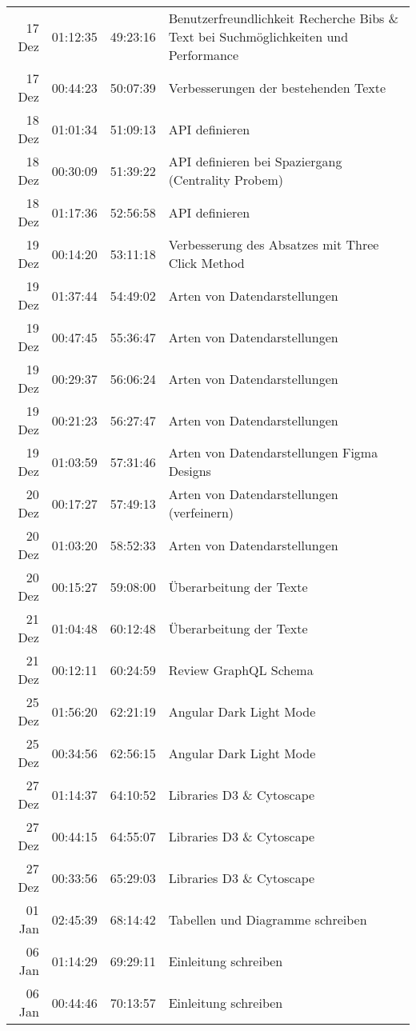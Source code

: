\begin{longtable}{r | r | r | p{}}
	 17 Dez & 01:12:35 & 49:23:16 & Benutzerfreundlichkeit Recherche Bibs \& Text bei Suchmöglichkeiten und Performance \\ 
	 17 Dez & 00:44:23 & 50:07:39 & Verbesserungen der bestehenden Texte \\ 
	 18 Dez & 01:01:34 & 51:09:13 & API definieren \\ 
	 18 Dez & 00:30:09 & 51:39:22 & API definieren bei Spaziergang (Centrality Probem) \\ 
	 18 Dez & 01:17:36 & 52:56:58 & API definieren \\ 
	 19 Dez & 00:14:20 & 53:11:18 & Verbesserung des Absatzes mit Three Click Method \\ 
	 19 Dez & 01:37:44 & 54:49:02 & Arten von Datendarstellungen \\ 
	 19 Dez & 00:47:45 & 55:36:47 & Arten von Datendarstellungen \\ 
	 19 Dez & 00:29:37 & 56:06:24 & Arten von Datendarstellungen \\ 
	 19 Dez & 00:21:23 & 56:27:47 & Arten von Datendarstellungen \\ 
	 19 Dez & 01:03:59 & 57:31:46 & Arten von Datendarstellungen Figma Designs \\ 
	 20 Dez & 00:17:27 & 57:49:13 & Arten von Datendarstellungen (verfeinern) \\ 
	 20 Dez & 01:03:20 & 58:52:33 & Arten von Datendarstellungen \\ 
	 20 Dez & 00:15:27 & 59:08:00 & Überarbeitung der Texte \\ 
	 21 Dez & 01:04:48 & 60:12:48 & Überarbeitung der Texte \\ 
	 21 Dez & 00:12:11 & 60:24:59 & Review GraphQL Schema \\ 
	 25 Dez & 01:56:20 & 62:21:19 & Angular Dark Light Mode \\ 
	 25 Dez & 00:34:56 & 62:56:15 & Angular Dark Light Mode \\ 
	 27 Dez & 01:14:37 & 64:10:52 & Libraries D3 \& Cytoscape \\ 
	 27 Dez & 00:44:15 & 64:55:07 & Libraries D3 \& Cytoscape \\ 
	 27 Dez & 00:33:56 & 65:29:03 & Libraries D3 \& Cytoscape \\ 
	 01 Jan & 02:45:39 & 68:14:42 & Tabellen und Diagramme schreiben \\ 
	 06 Jan & 01:14:29 & 69:29:11 & Einleitung schreiben \\ 
	 06 Jan & 00:44:46 & 70:13:57 & Einleitung schreiben \\ 

\end{longtable}
